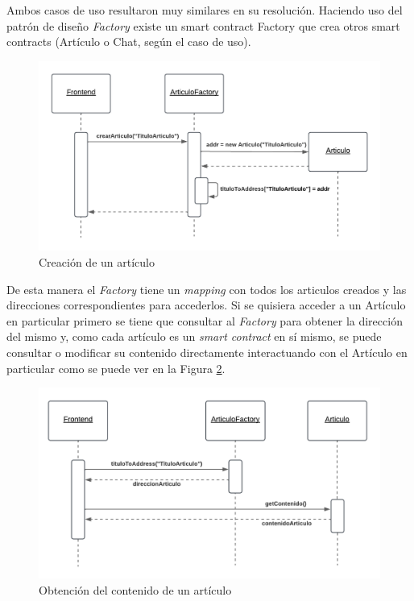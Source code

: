 Ambos casos de uso resultaron muy similares en su resolución. Haciendo uso del patrón de diseño \textit{Factory} existe un smart contract Factory que crea otros smart contracts (Artículo o Chat, según el caso de uso).

\begin{figure}[h]
    \centering
    \includegraphics[width=0.75\linewidth]{img/ds-aw-eth-crear-articulo.png}
    \caption{Creación de un artículo}
    \label{fig:ds-aw-eth-crear-articulo}
\end{figure}

De esta manera el \textit{Factory} tiene un \textit{mapping} con todos los articulos creados y las direcciones correspondientes para accederlos. Si se quisiera acceder a un Artículo en particular primero se tiene que consultar al \textit{Factory} para obtener la dirección del mismo y, como cada artículo es un \textit{smart contract} en sí mismo, se puede consultar o modificar su contenido directamente interactuando con el Artículo en particular como se puede ver en la Figura \ref{fig:ds-aw-eth-obtener-contenido-articulo}.

\begin{figure}[h]
    \centering
    \includegraphics[width=0.75\linewidth]{img/ds-aw-eth-obtener-contenido-articulo.png}
    \caption{Obtención del contenido de un artículo}
    \label{fig:ds-aw-eth-obtener-contenido-articulo}
\end{figure}
